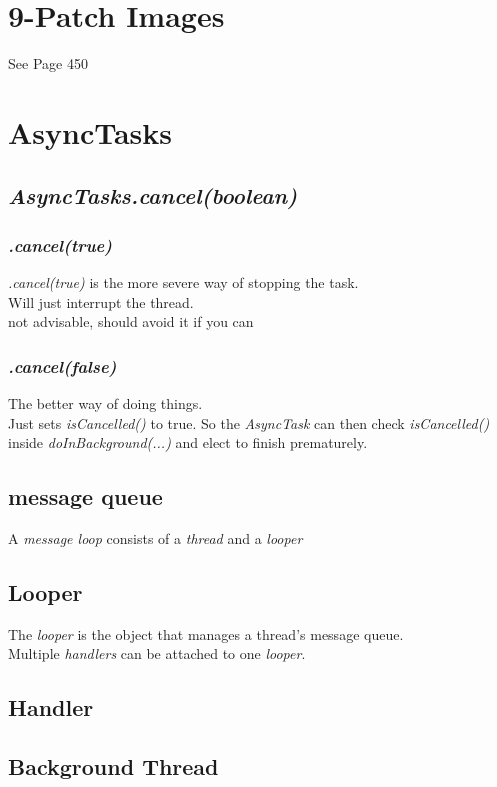 \documentclass[]{article}
\renewcommand{\it}[1]{\textit{#1}}
\begin{document}
\section{9-Patch Images}
See Page 450 

\section{AsyncTasks}
\subsection{\it{AsyncTasks.cancel(boolean)}}
\subsubsection{\it{.cancel(true)}}
\textit{.cancel(true)} is the more severe way of stopping the task.
\\
Will just interrupt the thread.
\\
not advisable, should avoid it if you can
\subsubsection{\it{.cancel(false)}}
The better way of doing things.
\\
Just sets \textit{isCancelled()} to true.  So the \textit{AsyncTask} can then check \textit{isCancelled()} inside \textit{doInBackground(...)} and elect to finish prematurely.

\subsection{message queue}
A \it{message loop} consists of a \it{thread} and a \it{looper}

\subsection{Looper}
The \it{looper} is the object that manages a thread's message queue.
\\
Multiple \it{handlers}  can be attached to one \it{looper}.	

\subsection{Handler}

\subsection{Background Thread}
\end{document}
